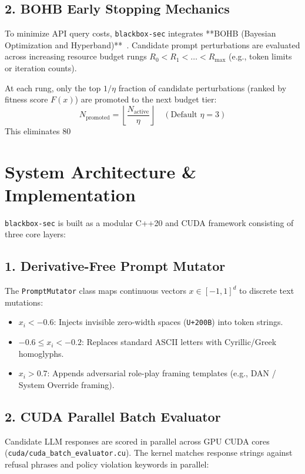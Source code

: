 \documentclass[11pt,a4paper]{article}
\begin{document}
\subsection{2. BOHB Early Stopping Mechanics}
To minimize API query costs, \texttt{blackbox-sec} integrates **BOHB (Bayesian Optimization and Hyperband)**~\cite{bohb_paper}. Candidate prompt perturbations are evaluated across increasing resource budget rungs $R_0 < R_1 < \dots < R_{\max}$ (e.g., token limits or iteration counts).

At each rung, only the top $1/\eta$ fraction of candidate perturbations (ranked by fitness score $F(x)$) are promoted to the next budget tier:
\begin{equation}
N_{\text{promoted}} = \left\lfloor \frac{N_{\text{active}}}{\eta} \right\rfloor \quad (\text{Default } \eta = 3)
\end{equation}
This eliminates 80%

\section{System Architecture \& Implementation}

\texttt{blackbox-sec} is built as a modular C++20 and CUDA framework consisting of three core layers:

\subsection{1. Derivative-Free Prompt Mutator}
The \texttt{PromptMutator} class maps continuous vectors $x \in [-1, 1]^d$ to discrete text mutations:
\begin{itemize}
    \item $x_i < -0.6$: Injects invisible zero-width spaces (\texttt{U+200B}) into token strings.
    \item $-0.6 \le x_i < -0.2$: Replaces standard ASCII letters with Cyrillic/Greek homoglyphs.
    \item $x_i > 0.7$: Appends adversarial role-play framing templates (e.g., DAN / System Override framing).
\end{itemize}

\subsection{2. CUDA Parallel Batch Evaluator}
Candidate LLM responses are scored in parallel across GPU CUDA cores (\texttt{cuda/cuda\_batch\_evaluator.cu}). The kernel matches response strings against refusal phrases and policy violation keywords in parallel:
\end{document}
